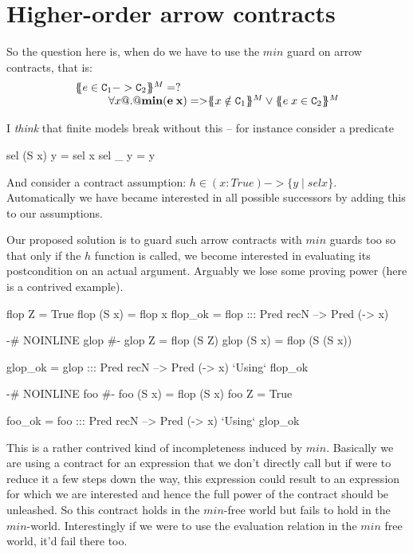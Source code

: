 \documentclass[preprint]{sigplanconf}
\begin{document}
\section{Higher-order arrow contracts}

So the question here is, when do we have to use the $min$ guard on arrow contracts, that is:
\[\begin{array}{l}
    \ctrans{}{}{e \in \Ct_1 -> \Ct_2}^M =? \\
      \qquad\quad \forall x @.@ {\bf min(e\;x) =>} 
                   \ctrans{}{}{x \notin \Ct_1}^M \lor \ctrans{}{}{e\;x \in \Ct_2}^M 
\end{array}\]


I {\em think} that finite models break without this -- for instance consider a predicate 
\begin{code}
   sel (S x) y = sel x
   sel _     y = y 
\end{code}
And consider a contract assumption: $h \in (x:True) -> \{ y \mid sel x \}$. Automatically 
we have became interested in all possible successors by adding this to our assumptions.

Our proposed solution is to guard such arrow contracts with $min$ guards too so that only if the 
$h$ function is called, we become interested in evaluating its postcondition on an actual argument.
Arguably we lose some proving power (here is a contrived example).

\begin{code}
flop Z = True
flop (S x) = flop x
flop_ok = flop ::: Pred recN --> Pred (\x -> x)

{-# NOINLINE glop #-}
glop Z     = flop (S Z)
glop (S x) = flop (S (S x))

glop_ok = glop ::: Pred recN --> Pred (\x -> x)
               `Using` flop_ok

{-# NOINLINE foo #-}
foo (S x) = flop (S x)
foo Z     = True

foo_ok = foo ::: Pred recN --> Pred (\x -> x)
             `Using` glop_ok
\end{code}
This is a rather contrived kind of incompleteness induced by $min$. 
Basically we are using a contract for an expression that we don't 
directly call but if were to reduce it a few steps down the way, this 
expression could result to an expression for which we are interested 
and hence the full power of the contract should be unleashed. So this
contract holds in the $min$-free world but fails to hold in the $min$-world.
Interestingly if we were to use the evaluation relation in the $min$ free
world, it'd fail there too.
\end{document}

